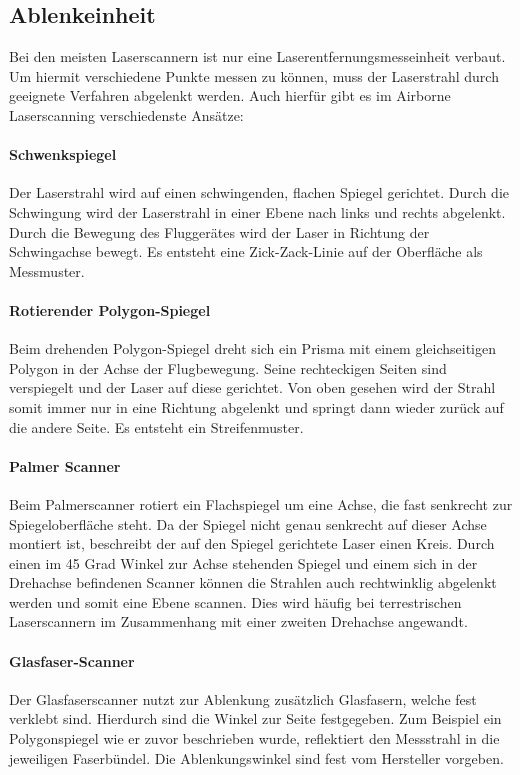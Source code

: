 \documentclass[a4paper,12pt,bibliography=totoc, listof=totoc,titlepage,pointlessnumbers]{scrreprt}
\begin{document}
\subsection{Ablenkeinheit}
Bei den meisten Laser\-scan\-nern ist nur eine Laserentfernungsmesseinheit verbaut. Um hiermit verschiedene Punkte messen zu können, muss der Laserstrahl durch geeignete Verfahren abgelenkt werden. Auch hierfür gibt es im Airborne Laserscanning verschiedenste Ansätze:

\paragraph{Schwenkspiegel}
Der Laserstrahl wird auf einen schwingenden, flachen Spiegel gerichtet. Durch die Schwingung wird der Laserstrahl in einer Ebene nach links und rechts abgelenkt. Durch die Bewegung des Fluggerätes wird der Laser in Richtung der Schwingachse bewegt. Es entsteht eine Zick-Zack-Linie auf der Oberfläche als Messmuster.

\paragraph{Rotierender Polygon-Spiegel}
Beim drehenden Polygon-Spiegel dreht sich ein Prisma mit einem gleichseitigen Polygon in der Achse der Flugbewegung. Seine rechteckigen Seiten sind verspiegelt und der Laser auf diese gerichtet. Von oben gesehen wird der Strahl somit immer nur in eine Richtung abgelenkt und springt dann wieder zurück auf die andere Seite. Es entsteht ein Streifenmuster.

\paragraph{Palmer Scanner}
Beim Palmerscanner rotiert ein Flachspiegel um eine Achse, die fast senkrecht zur Spiegeloberfläche steht. Da der Spiegel nicht genau senkrecht auf dieser Achse montiert ist, beschreibt der auf den Spiegel gerichtete Laser einen Kreis. Durch einen im 45 Grad Winkel zur Achse stehenden Spiegel und einem sich in der Drehachse befindenen Scanner können die Strahlen auch rechtwinklig abgelenkt werden und somit eine Ebene scannen. Dies wird häufig bei terrestrischen Laser\-scan\-nern im Zusammenhang mit einer zweiten Drehachse angewandt.

\paragraph{Glasfaser-Scanner}
\label{p:faserscanner}
Der Glasfaserscanner nutzt zur Ablenkung zusätzlich Glasfasern, welche fest verklebt sind. Hierdurch sind die Winkel zur Seite festgegeben. Zum Beispiel ein Polygonspiegel wie er zuvor beschrieben wurde, reflektiert den Messstrahl in die jeweiligen Faserbündel. Die Ablenkungswinkel sind fest vom Hersteller vorgeben.
\end{document}
